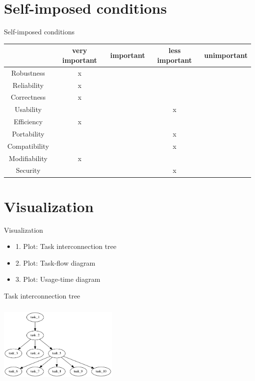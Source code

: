 \documentclass[18pt]{beamer}
\begin{document}
\section{Self-imposed conditions}
	\begin{frame}{Self-imposed conditions}
		\begin{tabular}{|c|c|c|c|c|}\hline
			& very important & important & less important & unimportant\\ \hline
			Robustness & x &&&\\ \hline
			Reliability & x &&&\\ \hline
			Correctness & x &&&\\ \hline
			Usability &&& x &\\ \hline
			Efficiency & x &&&\\ \hline
			Portability &&& x &\\ \hline
			Compatibility &&& x &\\ \hline
			Modifiability & x &&&\\ \hline
			Security &&& x &\\ \hline
			
		\end{tabular}
	\end{frame}
	
\section{Visualization}
	\begin{frame}{Visualization}
		\begin{itemize}
			\pause
			\item 1. Plot: Task interconnection tree
			\pause
			\item 2. Plot: Task-flow diagram
			\pause
			\item 3. Plot: Usage-time diagram
		\end{itemize}
	\end{frame}
	
	\begin{frame}{Task interconnection tree}
		\begin{center}
			\includegraphics[width=220px, height=150px]{images/task.png}
		\end{center}
	\end{frame}
	
\end{document}
